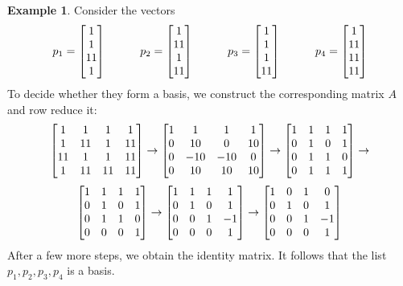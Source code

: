 \documentclass[reqno]{amsart}
\theoremstyle{definition}
\newtheorem{example}[theorem]{Example}
\begin{document}
\begin{example}\label{eg-basis-ii}
 Consider the vectors
 \[
  p_1 = \left[\begin{matrix}  1 \\  1 \\ 11 \\  1 \end{matrix}\right] \hspace{3em}
  p_2 = \left[\begin{matrix}  1 \\ 11 \\  1 \\ 11 \end{matrix}\right] \hspace{3em}
  p_3 = \left[\begin{matrix}  1 \\  1 \\  1 \\ 11 \end{matrix}\right] \hspace{3em}
  p_4 = \left[\begin{matrix}  1 \\ 11 \\ 11 \\ 11 \end{matrix}\right]
 \]
 To decide whether they form a basis, we construct the corresponding
 matrix $A$ and row reduce it:
 \[ \left[\begin{matrix}  1 &  1 &  1 &  1 \\
          1 & 11 &  1 & 11 \\
         11 &  1 &  1 & 11 \\
          1 & 11 & 11 & 11 \end{matrix}\right]
    \to
    \left[\begin{matrix}  1 &  1 &  1 &  1 \\
          0 & 10 &  0 & 10 \\
          0 &-10 &-10 &  0 \\
          0 & 10 & 10 & 10 \end{matrix}\right]
    \to
    \left[\begin{matrix}  1 &  1 &  1 &  1 \\
          0 &  1 &  0 &  1 \\
          0 &  1 &  1 &  0 \\
          0 &  1 &  1 &  1 \end{matrix}\right]
    \to
 \] \[
    \left[\begin{matrix}  1 &  1 &  1 &  1 \\
          0 &  1 &  0 &  1 \\
          0 &  1 &  1 &  0 \\
          0 &  0 &  0 &  1 \end{matrix}\right]
    \to
    \left[\begin{matrix}  1 &  1 &  1 &  1 \\
          0 &  1 &  0 &  1 \\
          0 &  0 &  1 & -1 \\
          0 &  0 &  0 &  1 \end{matrix}\right]
    \to
    \left[\begin{matrix}  1 &  0 &  1 &  0 \\
          0 &  1 &  0 &  1 \\
          0 &  0 &  1 & -1 \\
          0 &  0 &  0 &  1 \end{matrix}\right]
 \]
 After a few more steps, we obtain the identity matrix.  It follows
 that the list $p_1,p_2,p_3,p_4$ is a basis.
\end{example}
\end{document}
